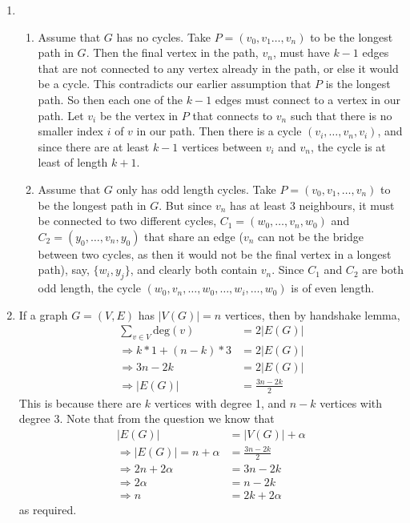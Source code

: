 \documentclass[10pt,english]{article}
\begin{document}
\begin{enumerate}
\pagebreak
\item \begin{enumerate}
    \item Assume that $G$ has no cycles. Take $P=(v_0,v_1\ldots,v_n)$ to be the longest path in $G$. Then the final vertex in the path, $v_n$, must have $k-1$ edges that are not connected to any vertex already in the path, or else it would be a cycle. This contradicts our earlier assumption that $P$ is the longest path. So then each one of the $k-1$ edges must connect to a vertex in our path. Let $v_i$ be the vertex in $P$ that connects to $v_n$ such that there is no smaller index $i$ of $v$ in our path. Then there is a cycle $(v_i,\ldots,v_n,v_i)$, and since there are at least $k-1$ vertices between $v_i$ and $v_n$, the cycle is at least of length $k+1$. 
    \item Assume that $G$ only has odd length cycles. Take $P=(v_0,v_1,\ldots,v_n)$ to be the longest path in $G$. But since $v_n$ has at least 3 neighbours, it must be connected to two different cycles, $C_1=(w_0,\ldots,v_n,w_0)$ and $C_2=(y_0,\ldots,v_n,y_0)$ that share an edge ($v_n$ can not be the bridge between two cycles, as then it would not be the final vertex in a longest path), say, $\{w_i,y_j\}$, and clearly both contain $v_n$. Since $C_1$ and $C_2$ are both odd length, the cycle $(w_0,v_n,\ldots,w_0,\ldots,w_i,\ldots,w_0)$ is of even length. 
\end{enumerate}

\pagebreak
\item If a graph $G=(V,E)$ has $|V(G)|=n$ vertices, then by handshake lemma, \begin{align*}\sum_{v\in V}\text{deg}(v)&=2|E(G)|\\\Rightarrow k*1+(n-k)*3&=2|E(G)|\\\Rightarrow 3n-2k&=2|E(G)|\\\Rightarrow |E(G)|&=\frac{3n-2k}{2}\end{align*} This is because there are $k$ vertices with degree 1, and $n-k$ vertices with degree 3. Note that from the question we know that \begin{align*}|E(G)|&=|V(G)|+\alpha\\\Rightarrow |E(G)|=n+\alpha&=\frac{3n-2k}{2}\\\Rightarrow 2n+2\alpha&=3n-2k\\\Rightarrow 2\alpha&=n-2k\\\Rightarrow n&=2k+2\alpha\end{align*} as required.


\end{enumerate}
\end{document}
